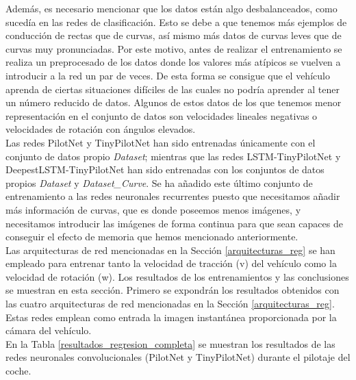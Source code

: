 Además, es necesario mencionar que los datos están algo desbalanceados, como sucedía en las redes de clasificación. Esto se debe a que tenemos más ejemplos de conducción de rectas que de curvas, así mismo más datos de curvas leves que de curvas muy pronunciadas. Por este motivo, antes de realizar el entrenamiento se realiza un preprocesado de los datos donde los valores más atípicos se vuelven a introducir a la red un par de veces. De esta forma se consigue que el vehículo aprenda de ciertas situaciones difíciles de las cuales no podría aprender al tener un número reducido de datos. Algunos de estos datos de los que tenemos menor representación en el conjunto de datos son velocidades lineales negativas o velocidades de rotación con ángulos elevados.\\

Las redes PilotNet y TinyPilotNet han sido entrenadas únicamente con el conjunto de datos propio \textit{Dataset}; mientras que las redes LSTM-TinyPilotNet y DeepestLSTM-TinyPilotNet han sido entrenadas con los conjuntos de datos propios \textit{Dataset} y \textit{Dataset\_Curve}. Se ha añadido este último conjunto de entrenamiento a las redes neuronales recurrentes puesto que necesitamos añadir más información de curvas, que es donde poseemos menos imágenes, y necesitamos introducir las imágenes de forma continua para que sean capaces de conseguir el efecto de memoria que hemos mencionado anteriormente.\\

Las arquitecturas de red mencionadas en la Sección \ref{arquitecturas_reg} se han empleado para entrenar tanto la velocidad de tracción (v) del vehículo como la velocidad de rotación (w). Los resultados de los entrenamientos y las conclusiones se muestran en esta sección. Primero se expondrán los resultados obtenidos con las cuatro arquitecturas de red mencionadas en la Sección \ref{arquitecturas_reg}. Estas redes emplean como entrada la imagen instantánea proporcionada por la cámara del vehículo.\\

En la Tabla \ref{resultados_regresion_completa} se muestran los resultados de las redes neuronales convolucionales (PilotNet y TinyPilotNet) durante el pilotaje del coche. \\

